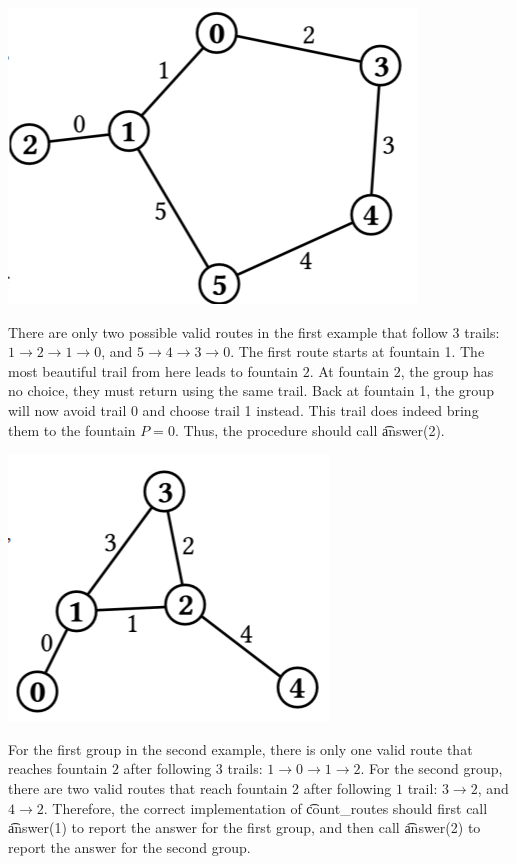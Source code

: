 \includegraphics{garden1.png}

There are only two possible valid routes in the first example that follow 3 trails:
$1 \rightarrow 2 \rightarrow 1 \rightarrow 0$, and $5 \rightarrow 4 \rightarrow 3 \rightarrow 0$. The first route starts at fountain 1. The most beautiful trail from here leads to fountain $2$. At fountain $2$, the group has no choice, they must return using the same trail. Back at fountain 1, the group will now avoid trail 0 and choose trail 1 instead. This trail does indeed bring them to the fountain $P=0$. Thus, the procedure should call \t{answer(2)}.

\includegraphics{garden2.png}


For the first group in the second example, there is only one valid route that reaches
fountain $2$ after following 3 trails: $1 \rightarrow 0 \rightarrow 1 \rightarrow 2$.
For the second group, there are two valid routes that reach fountain 2 after following $1$ trail: $3 \rightarrow 2$, and $4 \rightarrow 2$. Therefore, the correct implementation of \t{count\_routes} should first call \t{answer(1)} to report the answer for the first group, and then call \t{answer(2)} to report the answer for the second group.